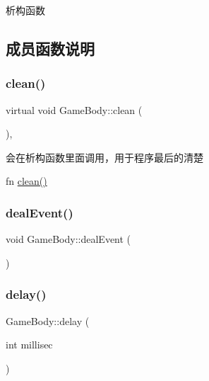 析构函数 



\subsection{成员函数说明}
\mbox{\label{class_game_body_a804c0e5d53cf79d8b4262ece694be204}} 
\subsubsection{\texorpdfstring{clean()}{clean()}}
{\footnotesize\ttfamily virtual void Game\+Body\+::clean (\begin{DoxyParamCaption}{ }\end{DoxyParamCaption})\hspace{0.3cm}{\ttfamily [inline]}, {\ttfamily [virtual]}}



会在析构函数里面调用，用于程序最后的清楚 

fn \mbox{\hyperlink{class_game_body_a804c0e5d53cf79d8b4262ece694be204}{clean()}} \mbox{\label{class_game_body_af1478ab73274e52227253841d16df8bb}} 
\subsubsection{\texorpdfstring{dealEvent()}{dealEvent()}}
{\footnotesize\ttfamily void Game\+Body\+::deal\+Event (\begin{DoxyParamCaption}{ }\end{DoxyParamCaption})\hspace{0.3cm}{\ttfamily [protected]}}

\mbox{\label{class_game_body_a402e91bd648142d2b4925a6923860852}} 
\subsubsection{\texorpdfstring{delay()}{delay()}}
{\footnotesize\ttfamily Game\+Body\+::delay (\begin{DoxyParamCaption}\item[{int}]{millisec }\end{DoxyParamCaption})\hspace{0.3cm}{\ttfamily [virtual]}}



